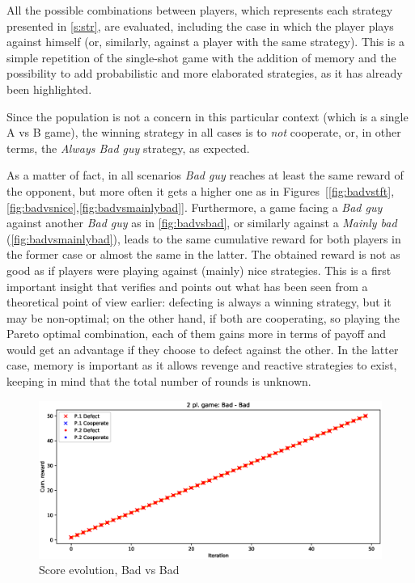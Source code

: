 \documentclass[journal,10pt,twoside]{IEEEtran}
\begin{document}
All the possible combinations between players, which represents each strategy presented in \autoref{s:str}, are evaluated, including the case in which the player plays against himself (or, similarly, against a player with the same strategy).
This is a simple repetition of the single-shot game with the addition of memory and the possibility to add probabilistic and more elaborated strategies, as it has already been highlighted.

Since the population is not a concern in this particular context (which is a single A vs B game), the winning strategy in all cases is to \textit{not} cooperate, or, in other terms, the \textit{Always Bad guy} strategy, as expected.

As a matter of fact, in all scenarios \textit{Bad guy} reaches at least the same reward of the opponent, but more often it gets a higher one as in Figures~[\ref{fig:badvstft},\ref{fig:badvsnice},\ref{fig:badvsmainlybad}]. 
Furthermore, a game facing a \textit{Bad guy} against another \textit{Bad guy} as in \autoref{fig:badvsbad}, or similarly against a \textit{Mainly bad} (\autoref{fig:badvsmainlybad}), leads to the same cumulative reward for both players in the former case or almost the same in the latter. The obtained reward is not as good as if players were playing against (mainly) nice strategies.
This is a first important insight that verifies and points out what has been seen from a theoretical point of view earlier: defecting is always a winning strategy, but it may be non-optimal; on the other hand, if both are cooperating, so playing the Pareto optimal combination, each of them gains more in terms of payoff and would get an advantage if they choose to defect against the other. In the latter case, memory is important as it allows revenge and reactive strategies to exist, keeping in mind that the total number of rounds is unknown. 

\begin{figure}[!ht]
    \centering
    \includegraphics[width=.9\columnwidth]{../img/ipd2p/ipd2p-rewards-Bad-Bad}
    \caption{Score evolution, Bad vs Bad}
    \label{fig:badvsbad}
\end{figure}
\end{document}
